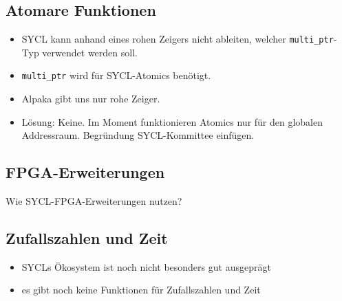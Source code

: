 \subsection{Atomare Funktionen}\label{implementierung:probleme:atomics}

\begin{itemize}
    \item SYCL kann anhand eines rohen Zeigers nicht ableiten, welcher
          \texttt{multi\_ptr}-Typ verwendet werden soll.
    \item \texttt{multi\_ptr} wird für SYCL-Atomics benötigt.
    \item Alpaka gibt uns nur rohe Zeiger.
    \item Lösung: Keine. Im Moment funktionieren Atomics nur für den globalen
          Addressraum. Begründung SYCL-Kommittee einfügen.
\end{itemize}

\subsection{FPGA-Erweiterungen}\label{implementierung:probleme:fpga}

Wie SYCL-FPGA-Erweiterungen nutzen?

\subsection{Zufallszahlen und Zeit}

\begin{itemize}
    \item SYCLs Ökosystem ist noch nicht besonders gut ausgeprägt
    \item es gibt noch keine Funktionen für Zufallszahlen und Zeit
\end{itemize}
